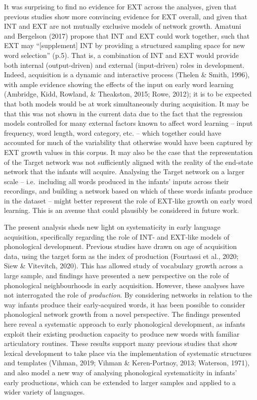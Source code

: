 \documentclass[
  man]{apa6}
\begin{document}
It was surprising to find no evidence for EXT across the analyses, given that previous studies show more convincing evidence for EXT overall, and given that INT and EXT are not mutually exclusive models of network growth. Amatuni and Bergelson (2017) propose that INT and EXT could work together, such that EXT may ``{[}supplement{]} INT by providing a structured sampling space for new word selection'' (p.5). That is, a combination of INT and EXT would provide both internal (output-driven) and external (input-driven) roles in development. Indeed, acquisition is a dynamic and interactive process (Thelen \& Smith, 1996), with ample evidence showing the effects of the input on early word learning (Ambridge, Kidd, Rowland, \& Theakston, 2015; Rowe, 2012); it is to be expected that both models would be at work simultaneously during acquisition. It may be that this was not shown in the current data due to the fact that the regression models controlled for many external factors known to affect word learning -- input frequency, word length, word category, etc. -- which together could have accounted for much of the variability that otherwise would have been captured by EXT growth values in this corpus. It may also be the case that the representation of the Target network was not sufficiently aligned with the reality of the end-state network that the infants will acquire. Analysing the Target network on a larger scale -- i.e.~including all words produced in the infants' inputs across their recordings, and building a network based on which of these words infants produce in the dataset -- might better represent the role of EXT-like growth on early word learning. This is an avenue that could plausibly be considered in future work.

The present analysis sheds new light on systematicity in early language acquisition, specifically regarding the role of INT- and EXT-like models of phonological development. Previous studies have drawn on age of acquisition data, using the target form as the index of production (Fourtassi et al., 2020; Siew \& Vitevitch, 2020). This has allowed study of vocabulary growth across a large sample, and findings have presented a new perspective on the role of phonological neighbourhoods in early acquisition. However, these analyses have not interrogated the role of \emph{production}. By considering networks in relation to the way infants produce their early-acquired words, it has been possible to consider phonological network growth from a novel perspective. The findings presented here reveal a systematic approach to early phonological development, as infants exploit their existing production capacity to produce new words with familiar articulatory routines. These results support many previous studies that show lexical development to take place via the implementation of systematic structures and templates (Vihman, 2019; Vihman \& Keren-Portnoy, 2013; Waterson, 1971), and also model a new way of analysing phonological systematicity in infants' early productions, which can be extended to larger samples and applied to a wider variety of languages.
\end{document}
